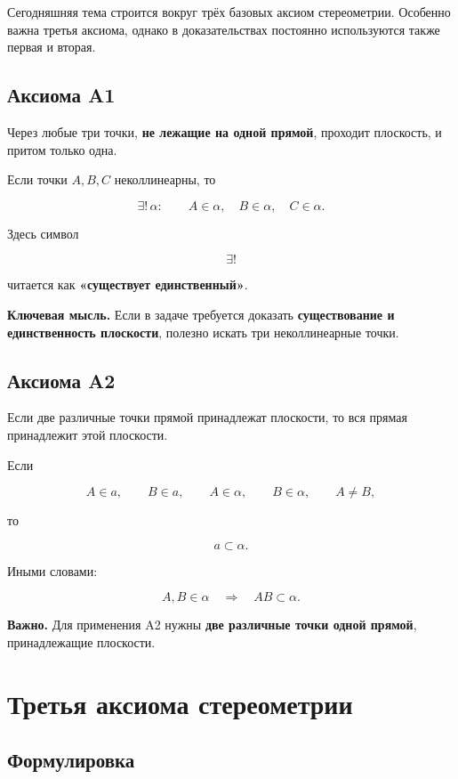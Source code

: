 \documentclass[a4paper,12pt]{article}
\newcommand{\keyidea}[1]{%
  \par\medskip
  {\color{darkaccent}\bfseries Ключевая мысль.} #1
  \par\medskip
}
\newcommand{\warning}[1]{%
  \par\medskip
  {\color{darkaccent}\bfseries Важно.} #1
  \par\medskip
}
\begin{document}
Сегодняшняя тема строится вокруг трёх базовых аксиом стереометрии.
Особенно важна третья аксиома, однако в доказательствах постоянно
используются также первая и вторая.

\subsection{Аксиома A1}

Через любые три точки, \textbf{не лежащие на одной прямой},
проходит плоскость, и притом только одна.

Если точки \(A,B,C\) неколлинеарны, то

\[
\exists!\,\alpha:
\qquad
A\in\alpha,\quad
B\in\alpha,\quad
C\in\alpha.
\]

Здесь символ

\[
\exists!
\]

читается как \textbf{«существует единственный»}.

\keyidea{
Если в задаче требуется доказать \textbf{существование и единственность
плоскости}, полезно искать три неколлинеарные точки.
}

\subsection{Аксиома A2}

Если две различные точки прямой принадлежат плоскости,
то вся прямая принадлежит этой плоскости.

Если

\[
A\in a,\qquad B\in a,\qquad
A\in\alpha,\qquad B\in\alpha,\qquad A\ne B,
\]

то

\[
a\subset\alpha.
\]

Иными словами:

\[
A,B\in\alpha
\quad\Longrightarrow\quad
AB\subset\alpha.
\]

\warning{
Для применения A2 нужны \textbf{две различные точки одной прямой},
принадлежащие плоскости.
}


\section{Третья аксиома стереометрии}

\subsection{Формулировка}
\end{document}
